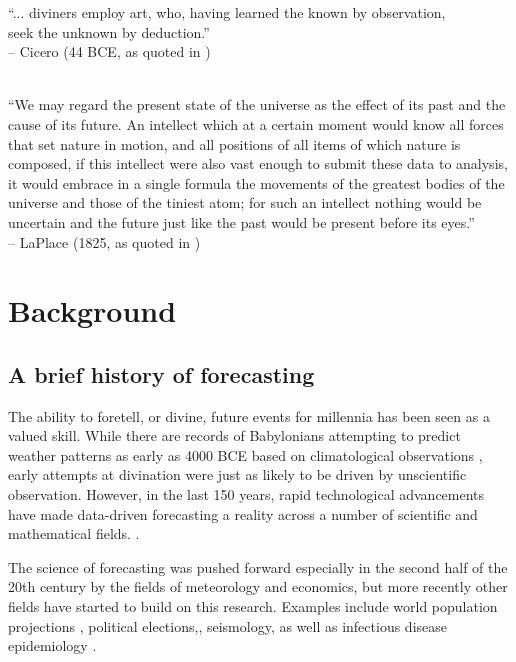 \documentclass[a4paper]{article}
\begin{document}
\begin{center}
``... diviners employ art, who, having learned the known by observation, \\ seek the unknown by deduction.''  \\ 
-- Cicero (44 BCE, as quoted in \cite{mccloskey1992art})

\ \\

``We may regard the present state of the universe as the effect of its past and the cause of its future. An intellect which at a certain moment would know all forces that set nature in motion, and all positions of all items of which nature is composed, if this intellect were also vast enough to submit these data to analysis, it would embrace in a single formula the movements of the greatest bodies of the universe and those of the tiniest atom; for such an intellect nothing would be uncertain and the future just like the past would be present before its eyes.''\\ -- LaPlace (1825, as quoted in \cite{Silver2012})

\end{center}

\section{Background}
\subsection{A brief history of forecasting}
The ability to foretell, or divine, future events for millennia has been seen as a valued skill.
While there are records of Babylonians attempting to predict weather patterns as early as 4000 BCE based on climatological observations \cite{Milham1918}, early attempts at divination were just as likely to be driven by unscientific observation. 
However, in the last 150 years, rapid technological advancements have made data-driven forecasting a reality across a number of scientific and mathematical fields. .

The science of forecasting was pushed forward especially in the second half of the 20th century by the fields of meteorology and economics, but more recently other fields have started to build on this research.
Examples include world population projections \cite{gerland2014world, raftery2012bayesian}, political elections,\cite{campbell1996polls, graefe2015german, lewis2014us}, seismology\cite{field2009uniform,bray2013assessment,Chambers2012}, as well as infectious disease epidemiology \cite{biggerstaff2016results, lowe2014dengue, viboud2017rapidd, held2017probabilistic, Reich2016a}.
\end{document}
